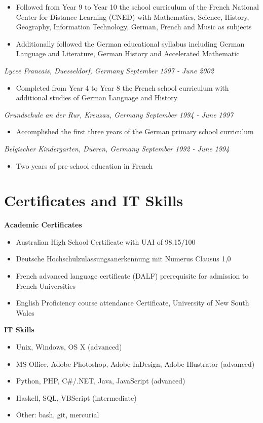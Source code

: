 \documentclass[margin]{res}
\begin{document}
\begin{resume}
  \begin{itemize} \itemsep -0.5pt 
  \item Followed from Year 9 to Year 10 the school curriculum of the French National Center for Distance Learning (CNED) with Mathematics, Science, History, Geography, Information Technology, German, French and Music as subjects
  \item Additionally followed the German educational syllabus including German Language and Literature, German History and Accelerated Mathematic
  \end{itemize}
  {\it Lycee Francais, Duesseldorf, Germany \hfill September 1997 - June 2002}
  \begin{itemize} \itemsep -0.5pt 
  \item Completed from Year 4 to Year 8 the French school curriculum with additional studies of German Language and History
  \end{itemize}
  {\it Grundschule an der Rur, Kreuzau, Germany \hfill September 1994 - June 1997}
  \begin{itemize} \itemsep -0.5pt 
  \item Accomplished the first three years of the German primary school curriculum
  \end{itemize}
  {\it Belgischer Kindergarten, Dueren, Germany \hfill September 1992 - June 1994}
  \begin{itemize} \itemsep -0.5pt 
  \item Two years of pre-school education in French
  \end{itemize}

\newpage

\section{Certificates and IT Skills}
  {\bf Academic Certificates}
  \begin{itemize} \itemsep -0.5pt 
  \item Australian High School Certificate with UAI of 98.15/100
  \item Deutsche Hochschulzulassungsanerkennung mit Numerus Clausus 1,0
  \item French advanced language certificate (DALF) prerequisite for admission to French Universities
  \item English Proficiency course attendance Certificate, University of New South Wales
  \end{itemize}
  {\bf IT Skills}
  \begin{itemize} \itemsep -0.5pt 
  \item Unix, Windows, OS X (advanced)
  \item MS Office, Adobe Photoshop, Adobe InDesign, Adobe Illustrator (advanced)
  \item Python, PHP, C\#/.NET, Java, JavaScript (advanced)
  \item Haskell, SQL, VBScript (intermediate)
  \item Other: bash, git, mercurial
  \end{itemize}


\end{resume}
\end{document}
